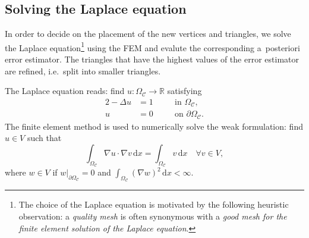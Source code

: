 \documentclass[12pt]{rmstyle}
\begin{document}
\subsection{Solving the Laplace equation}
\label{sec:poisson}

In order to decide on the placement of the new vertices and triangles, we solve
the Laplace equation\footnote{The choice of the Laplace equation is motivated by
the following heuristic observation: a \emph{quality mesh} is often synonymous
with a \emph{good mesh for the finite element solution of the Laplace
equation}.} using the FEM and evalute the corresponding a~posteriori error
estimator.  The triangles that have the highest values of the error estimator
are refined, i.e.~split into smaller triangles.

The Laplace equation reads: find $u : \Omega_{\mathcal{C}} \rightarrow \mathbb{R}$ satisfying
\begin{alignat}{2}
-\Delta u &= 1 \quad && \text{in $\Omega_{\mathcal{C}}$,} \\
u &= 0 \quad && \text{on $\partial \Omega_{\mathcal{C}}$.}
\end{alignat}
The finite element method is used to numerically solve the
weak formulation: find \(u \in V\) such that
\begin{equation}
   \label{eq:weakform}
   \int_{\Omega_{\mathcal{C}}} \nabla u \cdot \nabla v \,\mathrm{d}x = \int_{\Omega_{\mathcal{C}}} v\,\mathrm{d}x \quad \forall v \in V,
\end{equation}
where
\(w \in V\) if \(w |_{\partial \Omega_{\mathcal{C}}} = 0\) and
$
   \int_{\Omega_{\mathcal{C}}} (\nabla w)^2 \,\mathrm{d}x < \infty.
$
\end{document}

